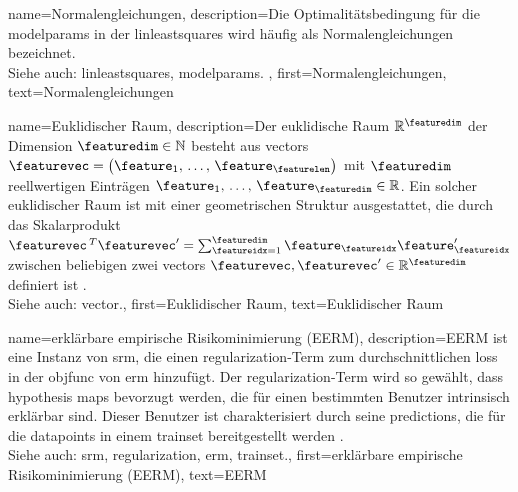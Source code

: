{{{{
{
    name={Normalengleichungen}, 
    description={Die Optimalitätsbedingung für die \glspl{modelparam} 
                 in der \gls{linleastsquares} wird häufig als Normalengleichungen bezeichnet.\\ 
                 Siehe auch: \gls{linleastsquares}, \glspl{modelparam}. },
    first={Normalengleichungen},
    text={Normalengleichungen} 
}

{
    name={Euklidischer Raum}, 
    description={Der euklidische Raum $\mathbb{R}^{\featuredim}$ der Dimension $\featuredim \in \mathbb{N}$ besteht aus \glspl{vector} 
                 $\featurevec= \big(\feature_{1}, \,\ldots, \,\feature_{\featurelen}\big)$ mit $\featuredim$ reellwertigen Einträgen 
                 $\feature_{1}, \,\ldots, \,\feature_{\featuredim} \in \mathbb{R}$. Ein solcher euklidischer Raum ist mit einer geometrischen 
                 Struktur ausgestattet, die durch das Skalarprodukt 
                 $\featurevec\,^{T} \featurevec' = \sum_{\featureidx=1}^{\featuredim} \feature_{\featureidx} \feature'_{\featureidx}$ 
                 zwischen beliebigen zwei \glspl{vector} $\featurevec,\featurevec' \in \mathbb{R}^{\featuredim}$ definiert ist \cite{RudinBookPrinciplesMatheAnalysis}.
                 \\
                 Siehe auch: \gls{vector}.},
    first={Euklidischer Raum},
    text={Euklidischer Raum} 
}

{
    name={erklärbare empirische Risikominimierung (EERM)}, 
    description={EERM ist eine Instanz von \gls{srm}, die einen 
                 \gls{regularization}-Term zum durchschnittlichen \gls{loss} in der \gls{objfunc} von \gls{erm} hinzufügt. 
                 Der \gls{regularization}-Term wird so gewählt, dass \gls{hypothesis} \glspl{map} bevorzugt werden, 
                 die für einen bestimmten Benutzer intrinsisch erklärbar sind. Dieser Benutzer ist charakterisiert durch seine 
                 \glspl{prediction}, die für die \glspl{datapoint} in einem \gls{trainset} bereitgestellt werden \cite{Zhang:2024aa}.
                 \\
                 Siehe auch: \gls{srm}, \gls{regularization}, \gls{erm}, \gls{trainset}.},
    first={erklärbare empirische Risikominimierung (EERM)},
    text={EERM} 
}

}}}}
